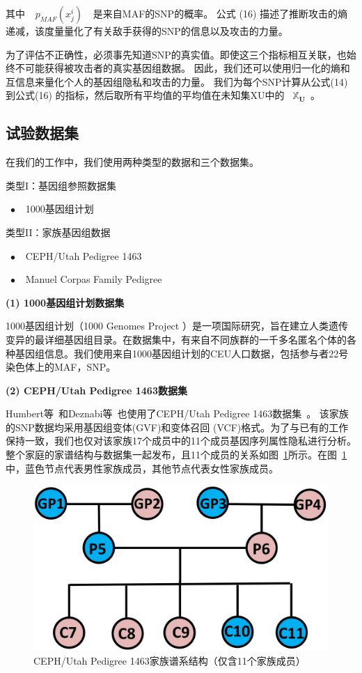 其中 ~$~p_{MAF}(x^i_j)~$~ 是来自MAF的SNP的概率。 公式 (16) 描述了推断攻击的熵递减，该度量量化了有关敌手获得的SNP的信息以及攻击的力量。

为了评估不正确性，必须事先知道SNP的真实值。即使这三个指标相互关联，也始终不可能获得被攻击者的真实基因组数据。 因此，我们还可以使用归一化的熵和互信息来量化个人的基因组隐私和攻击的力量。
我们为每个SNP计算从公式(14) 到公式(16) 的指标，然后取所有平均值的平均值在未知集XU中的 ~$\mathbb{X}_{\mathbf{U}}$~。


\subsection{试验数据集}

在我们的工作中，我们使用两种类型的数据和三个数据集。

类型I：基因组参照数据集

~$\bullet~$~ 1000基因组计划


类型II：家族基因组数据


~$\bullet~$~ CEPH/Utah Pedigree 1463 

~$\bullet~$~ Manuel Corpas Family Pedigree 

\textbf{(1) 1000基因组计划数据集}

1000基因组计划（1000 Genomes Project ）是一项国际研究，旨在建立人类遗传变异的最详细基因组目录。在数据集中，有来自不同族群的一千多名匿名个体的各种基因组信息。我们使用来自1000基因组计划的CEU人口数据，包括参与者22号染色体上的MAF，SNP。

\textbf{(2) CEPH/Utah Pedigree 1463数据集}

Humbert等~\cite{humbert2013addressing,humbert2017quantifying}和Deznabi等~\cite{deznabi2018inference}也使用了CEPH/Utah Pedigree 1463数据集~\cite{drmanac2010human}。
该家族的SNP数据均采用基因组变体(GVF)和变体召回 (VCF)格式。为了与已有的工作保持一致，我们也仅对该家族17个成员中的11个成员基因序列属性隐私进行分析。 整个家庭的家谱结构与数据集一起发布，且11个成员的关系如图~\ref{fig:CEPH-Utah-Pedigree}所示。在图~\ref{fig:CEPH-Utah-Pedigree}中，蓝色节点代表男性家族成员，其他节点代表女性家族成员。

\begin{figure}[htbp]
	\centering
	\includegraphics[width=0.6\linewidth]{./figures/CEPH-Utah-Pedigree.jpg}
	\centering
	\caption{CEPH/Utah Pedigree 1463家族谱系结构（仅含11个家族成员）}\label{fig:CEPH-Utah-Pedigree}
\end{figure}

